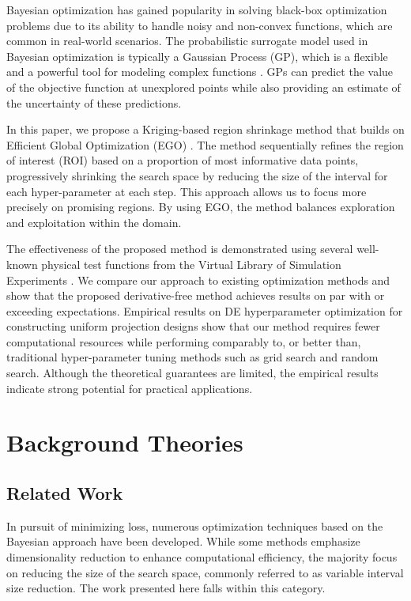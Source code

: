 \documentclass [PhD] {package/uclathes}
\begin{document}
Bayesian optimization has gained popularity in solving black-box optimization problems due to its ability to handle noisy and non-convex functions, which are common in real-world scenarios. The probabilistic surrogate model used in Bayesian optimization is typically a Gaussian Process (GP), which is a flexible and a powerful tool for modeling complex functions \parencite{rasmussen2006gaussian}. GPs can predict the value of the objective function at unexplored points while also providing an estimate of the uncertainty of these predictions.

In this paper, we propose a Kriging-based region shrinkage method that builds on Efficient Global Optimization (EGO) \parencite{jones1998efficient}. The method sequentially refines the region of interest (ROI) based on a proportion of most informative data points, progressively shrinking the search space by reducing the size of the interval for each hyper-parameter at each step. This approach allows us to focus more precisely on promising regions. By using EGO, the method balances exploration and exploitation within the domain.

The effectiveness of the proposed method is demonstrated using several well-known physical test functions from the Virtual Library of Simulation Experiments \parencite{simulationlib}. We compare our approach to existing optimization methods and show that the proposed derivative-free method achieves results on par with or exceeding expectations. Empirical results on DE hyperparameter optimization for constructing uniform projection designs show that our method requires fewer computational resources while performing comparably to, or better than, traditional hyper-parameter tuning methods such as grid search and random search. Although the theoretical guarantees are limited, the empirical results indicate strong potential for practical applications.

\section{Background Theories}
\subsection{Related Work}
In pursuit of minimizing loss, numerous optimization techniques based on the Bayesian approach have been developed. While some methods emphasize dimensionality reduction to enhance computational efficiency, the majority focus on reducing the size of the search space, commonly referred to as variable interval size reduction. The work presented here falls within this category.
\end{document}
